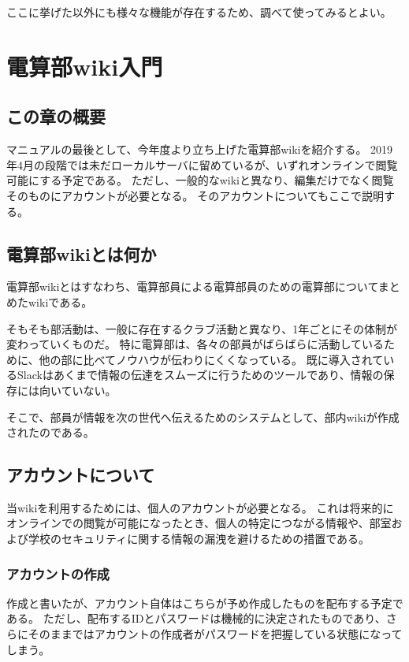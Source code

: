 \documentclass[lualatex,ja=standard,12pt,a4j]{bxjsbook}
\begin{document}
                
            	ここに挙げた以外にも様々な機能が存在するため、調べて使ってみるとよい。

	\chapter{電算部wiki入門}
    	\section{この章の概要}
        	マニュアルの最後として、今年度より立ち上げた電算部wikiを紹介する。
            2019年4月の段階では未だローカルサーバに留めているが、いずれオンラインで閲覧可能にする予定である。
            ただし、一般的なwikiと異なり、編集だけでなく閲覧そのものにアカウントが必要となる。
            そのアカウントについてもここで説明する。
            
        \section{電算部wikiとは何か}
        	電算部wikiとはすなわち、電算部員による電算部員のための電算部についてまとめたwikiである。
            
            そもそも部活動は、一般に存在するクラブ活動と異なり、1年ごとにその体制が変わっていくものだ。
            特に電算部は、各々の部員がばらばらに活動しているために、他の部に比べてノウハウが伝わりにくくなっている。
            既に導入されているSlackはあくまで情報の伝達をスムーズに行うためのツールであり、情報の保存には向いていない。
            
            そこで、部員が情報を次の世代へ伝えるためのシステムとして、部内wikiが作成されたのである。
            
        \section{アカウントについて}
        	当wikiを利用するためには、個人のアカウントが必要となる。
            これは将来的にオンラインでの閲覧が可能になったとき、個人の特定につながる情報や、部室および学校のセキュリティに関する情報の漏洩を避けるための措置である。
            
            \subsection{アカウントの作成}
            	作成と書いたが、アカウント自体はこちらが予め作成したものを配布する予定である。
                ただし、配布するIDとパスワードは機械的に決定されたものであり、さらにそのままではアカウントの作成者がパスワードを把握している状態になってしまう。
                
\end{document}
